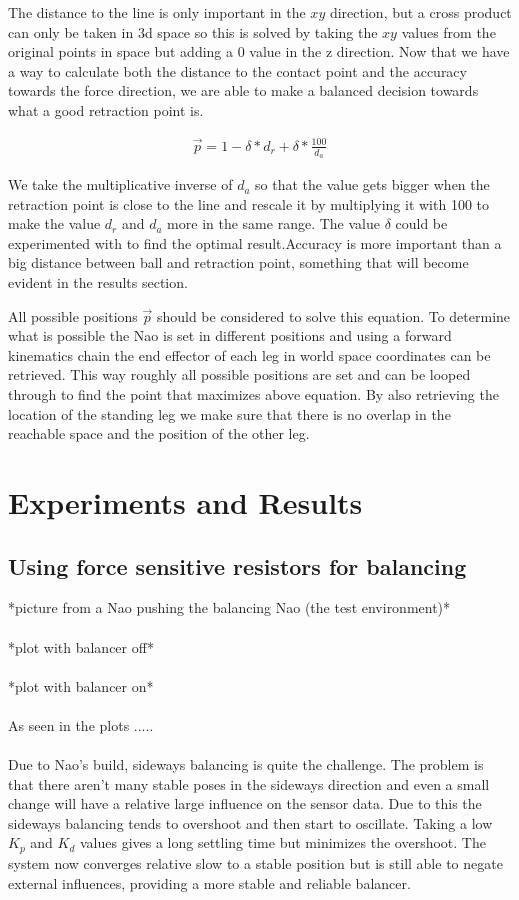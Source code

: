 \documentclass[a4paper]{article}
\begin{document}
The distance to the line is only important in the $xy$ direction, but a cross
product can only be taken in 3d space so this is solved by taking the $xy$
values from the original points in space but adding a 0 value in the z
direction.
Now that we have a way to calculate both the distance to the contact point and
the accuracy towards the force direction, we are able to make a balanced
decision towards what a good retraction point is.

\begin{align}
    \vec{p} = 1-\delta * d_r + \delta * \frac{100}{d_a}
\label{eq:delta}
\end{align}

We take the multiplicative inverse of $d_a$ so that the value gets bigger when the
retraction point is close to the line and rescale it by multiplying it with 100 to
make the value $d_r$ and $d_a$ more in the same range. The value $\delta$  could
be experimented with to find the optimal result.Accuracy is more important than a big distance between ball and
retraction point, something that will become evident in the results section.

All possible positions $\vec{p}$ should be considered to solve this equation. To
determine what is possible the Nao is set in different positions and using a
forward kinematics chain the end effector of each leg in world space coordinates
can be retrieved. This way roughly all possible positions are set and can be
looped through to find the point that maximizes above equation. By also
retrieving the location of the standing leg we make sure that there is
no overlap in the reachable space and the position of the other leg.


\section{Experiments and Results}

\subsection{Using force sensitive resistors for balancing}
*picture from a Nao pushing the balancing Nao (the test environment)*\\\\
*plot with balancer off*\\\\
*plot with balancer on*\\\\
As seen in the plots .....\\\\
Due to Nao's build, sideways balancing is quite the challenge.
The problem is that there aren't many stable poses in the sideways direction and even a small change will have a relative large influence on the sensor data.
Due to this the sideways balancing tends to overshoot and then start to oscillate.
Taking a low $K_p$ and $K_d$ values gives a long settling time but minimizes the overshoot.  
The system now converges relative slow to a stable position but is still able to negate external influences, providing a more stable and reliable balancer. 
\end{document}
